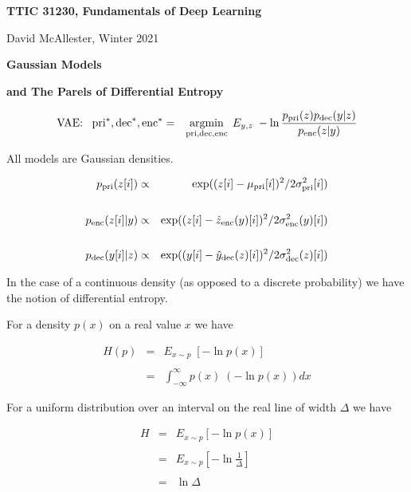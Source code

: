 




{\Huge

  \centerline{\bf TTIC 31230, Fundamentals of Deep Learning}
  \bigskip
  \centerline{David McAllester, Winter 2021}
  \vfill
  \centerline{\bf Gaussian Models}
  \vfill
  \centerline{\bf and The Parels of Differential Entropy}
  \vfill
\vfill
\vfill


\vfill
\begin{eqnarray*}
\mbox{VAE:}\;\;\;\mathrm{pri}^*,\mathrm{dec}^*,\mathrm{enc}^* &  = & \operatorname*{argmin}_{\mathrm{pri},\mathrm{dec},\mathrm{enc}}\;E_{y,z}  \;- \ln \frac{p_{\mathrm{pri}}(z)p_{\mathrm{dec}}(y|z)}{p_{\mathrm{enc}}(z|y)} \\
\end{eqnarray*}

\vfill
All models are Gaussian densities.

\vfill
{\huge 
\begin{eqnarray*}
p_{\mathrm{pri}}(z[i]) & \propto & \exp((z[i]-\mu_{\mathrm{pri}}[i])^2/2\sigma^2_{\mathrm{pri}}[i])\\
\\
p_{\mathrm{enc}}(z[i]|y) & \propto & \exp((z[i]-\hat{z}_{\mathrm{enc}}(y)[i])^2/2\sigma^2_{\mathrm{enc}}(y)[i])\\
\\
p_{\mathrm{dec}}(y[i]|z) & \propto & \exp((y[i]-\hat{y}_{\mathrm{dec}}(z)[i])^2/2\sigma_{\mathrm{dec}}^2(z)[i])\\
\end{eqnarray*}
}


In the case of a continuous density (as opposed to a discrete probability) we have the notion of differential entropy.

\vfill
For a density $p(x)$ on a real value $x$ we have

\vfill
\begin{eqnarray*}
H(p) & = & E_{x \sim p}\;\left[-\ln p(x)\right] \\
\\
& = &\int_{-\infty}^\infty p(x) \;(-\ln p(x)) dx
\end{eqnarray*}


For a uniform distribution over an interval on the real line of width $\Delta$ we have

\begin{eqnarray*}
H & = & E_{x \sim p} \left[-\ln p(x)\right] \\
\\
& = & E_{x \sim p} \left[-\ln \frac{1}{\Delta}\right] \\
\\
& = & \ln \Delta
\end{eqnarray*}

}

